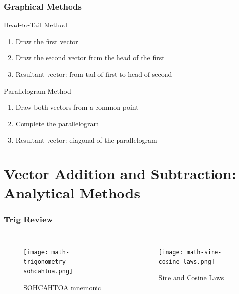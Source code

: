 \documentclass{beamer}
\begin{document}
\begin{frame}
\frametitle{Graphical Methods}
\begin{block}{Head-to-Tail Method}
\begin{enumerate}
\item Draw the first vector
\item Draw the second vector from the head of the first
\item Resultant vector: from tail of first to head of second
\end{enumerate}
\end{block}

\begin{block}{Parallelogram Method}
\begin{enumerate}
\item Draw both vectors from a common point
\item Complete the parallelogram
\item Resultant vector: diagonal of the parallelogram
\end{enumerate}
\end{block}
\end{frame}

\section{Vector Addition and Subtraction: Analytical Methods}

\begin{frame}
\frametitle{Trig Review}
\begin{columns}[T] %
    \begin{figure}
        \centering
        \texttt{[image: math-trigonometry-sohcahtoa.png]}
        \caption{SOHCAHTOA mnemonic}
    \end{figure}

    \begin{figure}
        \centering
        \texttt{[image: math-sine-cosine-laws.png]}
        \caption{Sine and Cosine Laws}
    \end{figure}
\end{columns}
\end{frame}
\end{document}
